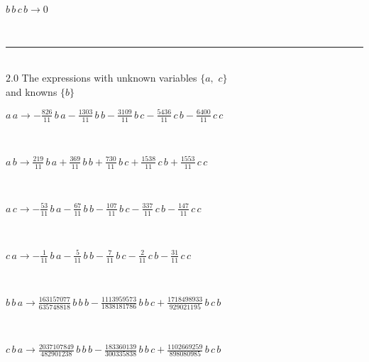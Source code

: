 \documentclass[rep10,leqno]{report}
\begin{document}
\begin{minipage}{6in}
$
b\,
 b\,
 c\,
 b\rightarrow 0
$
\end{minipage}\\
\rule[3pt]{6in}{.7pt}\\
$2.0$  The expressions with unknown variables $\{a,
$ $
c\}$\\
and knowns $\{b\}$\smallskip\\
\begin{minipage}{6in}
$
a\,
 a\rightarrow -\frac{826}{11}\,
 b\,
 a - \frac{1303}{11}\,
 b\,
 b - \frac{3109}{11}\,
 b\,
 c - \frac{5436}{11}\,
 c\,
 b - \frac{6400}{11}\,
 c\,
 c
$
\end{minipage}\medskip \\
\begin{minipage}{6in}
$
a\,
 b\rightarrow \frac{219}{11}\,
 b\,
 a + \frac{369}{11}\,
 b\,
 b + \frac{730}{11}\,
 b\,
 c + \frac{1538}{11}\,
 c\,
 b + \frac{1553}{11}\,
 c\,
 c
$
\end{minipage}\medskip \\
\begin{minipage}{6in}
$
a\,
 c\rightarrow -\frac{53}{11}\,
 b\,
 a - \frac{67}{11}\,
 b\,
 b - \frac{107}{11}\,
 b\,
 c - \frac{337}{11}\,
 c\,
 b - \frac{147}{11}\,
 c\,
 c
$
\end{minipage}\medskip \\
\begin{minipage}{6in}
$
c\,
 a\rightarrow -\frac{1}{11}\,
 b\,
 a - \frac{5}{11}\,
 b\,
 b - \frac{7}{11}\,
 b\,
 c - \frac{2}{11}\,
 c\,
 b - \frac{31}{11}\,
 c\,
 c
$
\end{minipage}\medskip \\
\begin{minipage}{6in}
$
b\,
 b\,
 a\rightarrow \frac{163157077}{635748818}\,
 b\,
 b\,
 b - \frac{1113959573}{1838181786}\,
 b\,
 b\,
 c + \frac{1718498933}{929021195}\,
 b\,
 c\,
 b
$
\end{minipage}\medskip \\
\begin{minipage}{6in}
$
c\,
 b\,
 a\rightarrow \frac{2037107849}{482901238}\,
 b\,
 b\,
 b - \frac{183360139}{300335838}\,
 b\,
 b\,
 c + \frac{1102669259}{898080985}\,
 b\,
 c\,
 b
$
\end{minipage}\\
\vspace{10pt}
\end{document}

